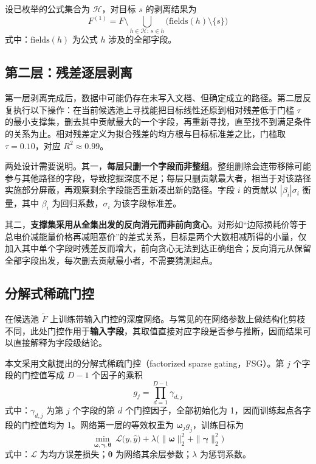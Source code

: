 \documentclass[UTF8,zihao=5,twoside]{ctexart}
\begin{document}
设已枚举的公式集合为 $\mathcal{H}$，对目标 $s$ 的剥离结果为
\begin{equation}
F^{(1)}=F\setminus\bigcup_{h\in\mathcal{H}:\,s\in h}\big(\mathrm{fields}(h)\setminus\{s\}\big)
\end{equation}
式中：$\mathrm{fields}(h)$ 为公式 $h$ 涉及的全部字段。

\subsection{第二层：残差逐层剥离}

第一层剥离完成后，数据中可能仍存在未写入文档、但确定成立的路径。第二层反复执行以下操作：在当前候选池上寻找能把目标线性还原到相对残差低于门槛 $\tau$ 的最小支撑集，删去其中贡献最大的一个字段，再重新寻找，直至找不到满足条件的关系为止。相对残差定义为拟合残差的均方根与目标标准差之比，门槛取 $\tau=0.10$，对应 $R^2\approx0.99$。

两处设计需要说明。其一，\textbf{每层只删一个字段而非整组}。整组删除会连带移除可能参与其他路径的字段，导致挖掘深度不足；每层只删贡献最大者，相当于对该路径实施部分屏蔽，再观察剩余字段能否重新凑出新的路径。字段 $i$ 的贡献以 $|\beta_i|\sigma_i$ 衡量，其中 $\beta_i$ 为回归系数，$\sigma_i$ 为该字段标准差。

其二，\textbf{支撑集采用从全集出发的反向消元而非前向贪心}。对形如“边际损耗价等于总电价减能量价格再减阻塞价”的差式关系，目标是两个大数相减所得的小量，仅加入其中单个字段时残差反而增大，前向贪心无法到达正确组合；反向消元从保留全部字段出发，每次删去贡献最小者，不需要猜测起点。

\subsection{分解式稀疏门控}

在候选池 $\tilde F$ 上训练带输入门控的深度网络。与常见的在网络参数上做结构化剪枝不同，此处门控作用于\textbf{输入字段}，其取值直接对应字段是否参与推断，因而结果可以直接解释为字段级结论。

本文采用文献\cite{ref-dgating}提出的分解式稀疏门控（factorized sparse gating，FSG）。第 $j$ 个字段的门控值写成 $D-1$ 个因子的乘积
\begin{equation}
g_j=\prod_{d=1}^{D-1}\gamma_{d,j}
\end{equation}
式中：$\gamma_{d,j}$ 为第 $j$ 个字段的第 $d$ 个门控因子，全部初始化为 1，因而训练起点各字段的门控值均为 1。网络第一层的等效权重为 $\bm{\omega}_j g_j$，训练目标为
\begin{equation}
\min_{\bm{\omega},\bm{\gamma},\bm{\theta}}\ \mathcal{L}\big(y,\hat y\big)
+\lambda\Big(\|\bm{\omega}\|_2^2+\|\bm{\gamma}\|_2^2\Big)
\end{equation}
式中：$\mathcal{L}$ 为均方误差损失；$\bm{\theta}$ 为网络其余层参数；$\lambda$ 为惩罚系数。
\end{document}
